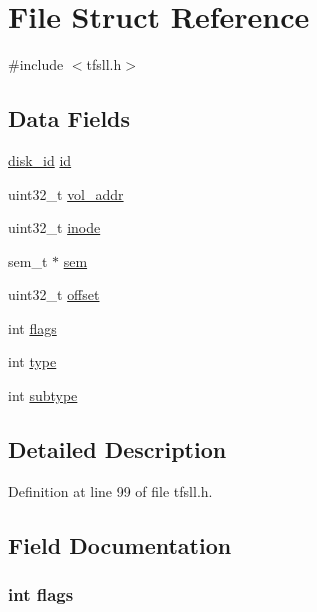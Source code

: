 \hypertarget{struct_file}{}\section{File Struct Reference}
\label{struct_file}


{\ttfamily \#include $<$tfsll.\+h$>$}

\subsection*{Data Fields}
\begin{DoxyCompactItemize}
\item 
\hyperlink{ll_8h_acb803223aeb697a794ba4d306d49fe2e}{disk\+\_\+id} \hyperlink{struct_file_a3be1ad207c610c62db1aefadd4f7b1ad}{id}
\item 
uint32\+\_\+t \hyperlink{struct_file_ae2b5f39731a59892a2da3865d1867c19}{vol\+\_\+addr}
\item 
uint32\+\_\+t \hyperlink{struct_file_a84dc3916ea975b79482a6d01f78c3d9f}{inode}
\item 
sem\+\_\+t $\ast$ \hyperlink{struct_file_a5c905d8d60d9e4d58e9a4a5ec07ec44c}{sem}
\item 
uint32\+\_\+t \hyperlink{struct_file_a894bdfa2d603d8343f8ef01dda6fcd23}{offset}
\item 
int \hyperlink{struct_file_ac8bf36fe0577cba66bccda3a6f7e80a4}{flags}
\item 
int \hyperlink{struct_file_ac765329451135abec74c45e1897abf26}{type}
\item 
int \hyperlink{struct_file_a7aacd365cfc725fe569f28df862fa5eb}{subtype}
\end{DoxyCompactItemize}


\subsection{Detailed Description}


Definition at line 99 of file tfsll.\+h.



\subsection{Field Documentation}
\hypertarget{struct_file_ac8bf36fe0577cba66bccda3a6f7e80a4}{}
\subsubsection[{flags}]{\setlength{\rightskip}{0pt plus 5cm}int flags}\label{struct_file_ac8bf36fe0577cba66bccda3a6f7e80a4}


